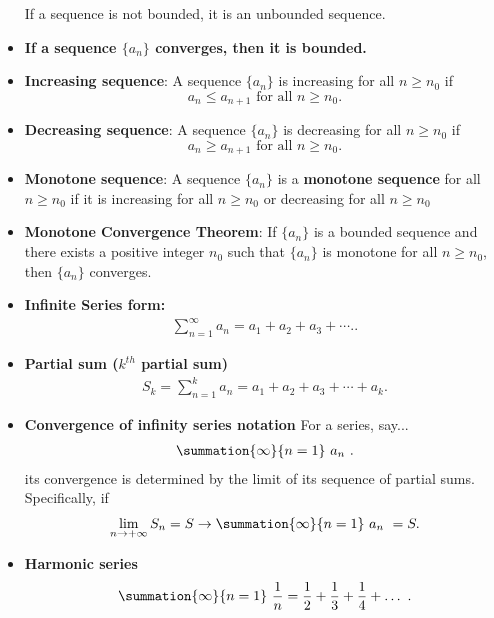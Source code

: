 \documentclass{report}
\begin{document}
\begin{itemize}
        If a sequence is not bounded, it is an unbounded sequence.
    \item \textbf{If a sequence  $\{a_{n}\} $ converges, then it is bounded.}
    \item \textbf{Increasing sequence}: A sequence \( \{a_n\} \) is increasing for all \( n \geq n_0 \) if
        \[ a_n \leq a_{n+1} \text{ for all } n \geq n_0. \]
    \item \textbf{Decreasing sequence}: A sequence \( \{a_n\} \) is decreasing for all \( n \geq n_0 \) if
        \[ a_n \geq a_{n+1} \text{ for all } n \geq n_0. \]
    \item \textbf{Monotone sequence}: A sequence \( \{a_n\} \) is a \textbf{monotone sequence} for all \( n \geq n_0 \) if it is increasing for all \( n \geq n_0 \) or decreasing for all \( n \geq n_0 \)
    \item \textbf{Monotone Convergence Theorem}:         If \( \{a_n\} \) is a bounded sequence and there exists a positive integer \( n_0 \) such that \( \{a_n\} \) is monotone for all \( n \geq n_0 \), then \( \{a_n\} \) converges.
    \item \textbf{Infinite Series form:}
        \begin{align*}
            \sum_{n=1}^{\infty} a_n = a_1 + a_2 + a_3 + \cdots.
        .\end{align*}
    \item \textbf{Partial sum ($k^{th}$ partial sum)}
        \begin{align*}
            S_k = \sum_{n=1}^{k} a_n = a_1 + a_2 + a_3 + \cdots + a_k
        .\end{align*}
    \item \textbf{Convergence of infinity series notation}
        \bigbreak \noindent 
        For a series, say...
        \begin{align*}
            \summation{\infty}{n=1}\ a_{n}\ 
        .\end{align*}
        its convergence is determined by the limit of its sequence of partial sums. Specifically, if
        \begin{align*}
            \lim\limits_{n \to +\infty}{S_{n}} = S \rightarrow \summation{\infty}{n=1}\ a_{n}\ = S 
        .\end{align*}
    \item \textbf{Harmonic series}
        \begin{align*}
            \summation{\infty}{n=1}\ \frac{1}{n}  =  \frac{1}{2} + \frac{1}{3} + \frac{1}{4} + \ldots\ 
        .\end{align*}

\end{itemize}
\end{document}
